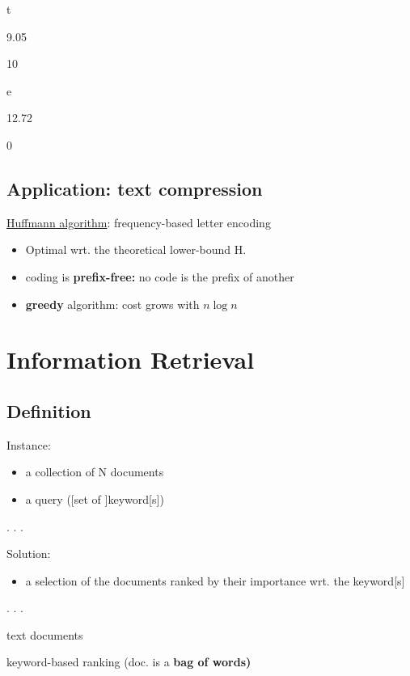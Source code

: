 \documentclass[
  letterpaper,
  DIV=11,
  numbers=noendperiod]{scrartcl}
\providecommand{\tightlist}{%
  \setlength{\itemsep}{0pt}\setlength{\parskip}{0pt}}\usepackage{longtable,booktabs,array}
\begin{document}
t

9.05

10

e

12.72

0

\subsection{Application: text
compression}\label{application-text-compression}

\href{https://en.wikipedia.org/wiki/Huffman_coding}{Huffmann algorithm}:
frequency-based letter encoding

\begin{itemize}
\item
  Optimal wrt. the theoretical lower-bound H.
\item
  coding is \textbf{prefix-free:} no code is the prefix of another
\item
  \textbf{greedy} algorithm: cost grows with \(n\log n\)
\end{itemize}

\section{Information Retrieval}\label{information-retrieval}

\subsection{Definition}\label{definition}

Instance:

\begin{itemize}
\item
  a collection of N documents
\item
  a query ({[}set of {]}keyword{[}s{]})
\end{itemize}

. . .

Solution:

\begin{itemize}
\tightlist
\item
  a selection of the documents ranked by their importance wrt. the
  keyword{[}s{]}
\end{itemize}

. . .

text documents

keyword-based ranking (doc. is a \textbf{bag of words)}
\end{document}
